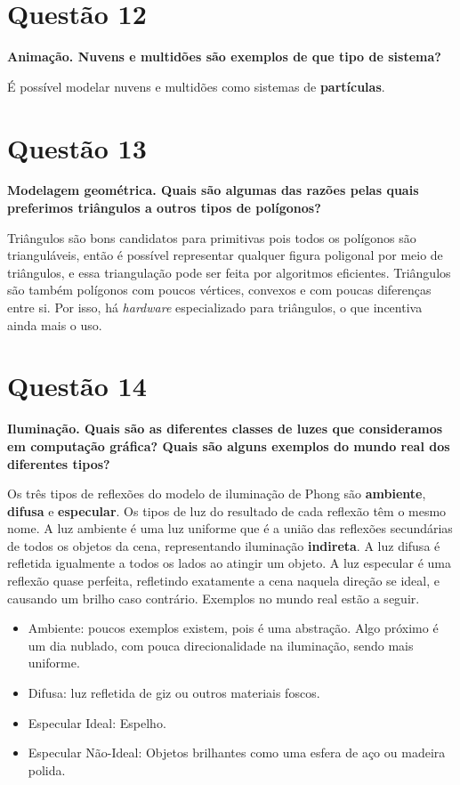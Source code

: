 \documentclass[12pt]{exam}
\begin{document}
\section*{Questão 12}
{\bfseries Animação. Nuvens e multidões são exemplos de que tipo de sistema?}

É possível modelar nuvens e multidões como sistemas de \textbf{partículas}.

\section*{Questão 13}
{\bfseries Modelagem geométrica. Quais são algumas das razões pelas quais preferimos triângulos a outros tipos de polígonos?}

Triângulos são bons candidatos para primitivas pois todos os polígonos são trianguláveis, então é possível representar qualquer figura poligonal por meio de triângulos, e essa triangulação pode ser feita por algoritmos eficientes. Triângulos são também polígonos com poucos vértices, convexos e com poucas diferenças entre si. Por isso, há \textit{hardware} especializado para triângulos, o que incentiva ainda mais o uso.

\section*{Questão 14}
{\bfseries Iluminação. Quais são as diferentes classes de luzes que consideramos em computação gráfica? Quais são alguns exemplos do mundo real dos diferentes tipos?}

Os três tipos de reflexões do modelo de iluminação de Phong são \textbf{ambiente}, \textbf{difusa} e \textbf{especular}. Os tipos de luz do resultado de cada reflexão têm o mesmo nome. A luz ambiente é uma luz uniforme que é a união das reflexões secundárias de todos os objetos da cena, representando iluminação \textbf{indireta}. A luz difusa é refletida igualmente a todos os lados ao atingir um objeto. A luz especular é uma reflexão quase perfeita, refletindo exatamente a cena naquela direção se ideal, e causando um brilho caso contrário. Exemplos no mundo real estão a seguir.

\begin{itemize}
    \item Ambiente: poucos exemplos existem, pois é uma abstração. Algo próximo é um dia nublado, com pouca direcionalidade na iluminação, sendo mais uniforme.
    \item Difusa: luz refletida de giz ou outros materiais foscos.
    \item Especular Ideal: Espelho.
    \item Especular Não-Ideal: Objetos brilhantes como uma esfera de aço ou madeira polida.
\end{itemize}
\end{document}
